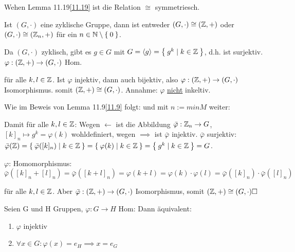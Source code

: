 \documentclass{../../meta/tudscript}
\begin{document}
            Wehen Lemma 11.19\ref{11.19} ist die Relation $\cong$ symmetriesch.
        
            Ist $(G, \cdot)$ eine zyklische Gruppe, dann ist entweder $(G, \cdot) \cong (\mathbb{Z}, +)$ oder $(G, \cdot) \cong (\mathbb{Z}_n, +)$ für ein $n \in \mathbb{N} \setminus \Set{0}$.

                Da $(G, \cdot)$ zyklisch, gibt es $g \in G$ mit $G = \langle g \rangle = \Set{g^k \mid k \in \mathbb{Z}}$, d.h.
                ist surjektiv. $\varphi: (\mathbb{Z}, +) \rightarrow (G, \cdot)$ Hom.

                für alle $k, l \in \mathbb{Z}$. Ist $\varphi$ injektiv, dann auch bijektiv, also $\varphi: (\mathbb{Z}, +) \rightarrow (G, \cdot)$ Isomorphismus.
                somit $(\mathbb{Z}, +) \cong (G, \cdot)$. Annahme: $\varphi$ \underline{nicht} inkeltiv.
                
                Wie im Beweis von Lemma 11.9\ref{11.9} folgt:
                und mit $n := min M$ weiter:

                Damit für alle $k, l \in \mathbb{Z}$:
                Wegen $\leftarrow$ ist die Abbildung $\bar{\varphi}: \mathbb{Z}_n \rightarrow G$, $[k]_n \mapsto g^k = \varphi (k)$ wohldefiniert, wegen $\implies$ ist $\bar{\varphi}$ injektiv.
                $\bar{\varphi}$ surjektiv: $\bar{\varphi} (\mathbb{Z}) = \Set{\bar{\varphi} ([k]_n) \mid k \in \mathbb{Z}} = \Set{\varphi (k) \mid k \in \mathbb{Z}} = \Set{g^k \mid k \in \mathbb{Z}} = G$.

                $\varphi$: Homomorphismus: $\bar{\varphi} ([k]_n + [l]_n) = \bar{\varphi} ([k+l]_n) = \varphi (k+l) = \varphi (k) \cdot \varphi (l) = \bar{\varphi} ([k]_n) \cdot \bar{\varphi} ([l]_n)$

                für alle $k, l \in \mathbb{Z}$. Aber $\bar{\varphi}: (\mathbb{Z}, +) \rightarrow (G, \cdot)$ Isomorphismus, somit $(\bZ, +) \cong (G, \cdot)\hfill\square$

            Seien G und H Gruppen, $\varphi: G \rightarrow H$ Hom: Dann äquivalent:
            \begin{enumerate}
                \item $\varphi$ injektiv
                \item $\forall x \in G:  \varphi (x) = e_H \implies x = e_G$
            \end{enumerate}
            
\end{document}
